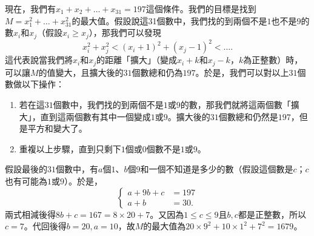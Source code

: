 \documentclass[math]{answer}
\begin{document}
\begin{questions}
{		現在，我們有$x_1 + x_2 + \dots + x_{31} = 197$這個條件。我們的目標是找到$M = x_1^2 + \dots + x_{31}^2$的最大值。假設說這31個數中，我們找的到兩個不是$1$也不是$9$的數$x_i$和$x_j$（假設$x_i \geq x_j$），那我們可以發現
		\[
			x_i^2 + x_j^2 < \left(x_i + 1\right)^2 + \left(x_j - 1\right)^2 < \dots.
		\]
		這代表說當我們將$x_i$和$x_j$的距離「擴大」（變成$x_i + k$和$x_j - k$，$k$為正整數）時，可以讓$M$的值變大，且擴大後的$31$個數總和仍為$197$。於是，我們可以對以上$31$個數做以下操作：
		\begin{enumerate}
			\item 若在這$31$個數中，我們找的到兩個不是$1$或$9$的數，那我們就將這兩個數「擴大」，直到這兩個數有其中一個變成$1$或$9$。擴大後的$31$個數總和仍然是$197$，但是平方和變大了。
			\item 重複以上步驟，直到只剩下$1$個或$0$個數不是$1$或$9$。
		\end{enumerate}
		假設最後的$31$個數中，有$a$個$1$、$b$個$9$和一個不知道是多少的數（假設這個數是$c$；$c$也有可能為$1$或$9$）。於是，
		\[
			\begin{cases}
				a + 9b + c & = 197 \\
				a + b      & = 30.
			\end{cases}
		\]
		兩式相減後得$8b + c = 167 = 8 \times 20 + 7$。又因為$1 \leq c \leq 9$且$b, c$都是正整數，所以$c = 7$。代回後得$b = 20, a = 10$，故$M$的最大值為$20 \times 9^2 + 10 \times 1^2 + 7^2 = 1679$。
	}

	\question
\end{questions}
\end{document}
